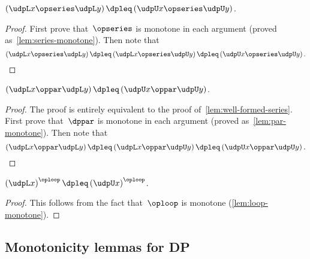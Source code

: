 \begin{lemma}
    \label{lem:well-formed-series}$\left(\udpL x\opseries\udpL y\right)\dpleq\left(\udpU x\opseries\udpU y\right)$.
\end{lemma}
\begin{proof}
    First prove that~$\opseries$ is monotone in each argument (proved
    as~\cref{lem:series-monotone}).
    Then note that
    \[
        \left(\udpL x\opseries\udpL y\right)\dpleq\left(\udpL x\opseries\udpU y\right)\dpleq\left(\udpU x\opseries\udpU y\right).
    \]
\end{proof}
\begin{lemma}
    \label{lem:well-formed-par}$\left(\udpL x\oppar\udpL y\right)\dpleq\left(\udpU x\oppar\udpU y\right)$.
\end{lemma}
\begin{proof}
    The proof is entirely equivalent to the proof of~\cref{lem:well-formed-series}.
    First prove that~$\dppar$ is monotone in each argument (proved as~\cref{lem:par-monotone}).
    Then note that~
    \[
        \left(\udpL x\oppar\udpL y\right)\dpleq\left(\udpL x\oppar\udpU y\right)\dpleq\left(\udpU x\oppar\udpU y\right).
    \]
\end{proof}

\begin{lemma}
    \label{lem:well-formed-loop}$\left(\udpL x\right)^{\oploop}\dpleq\left(\udpU x\right)^{\oploop}$.
\end{lemma}
\begin{proof}
    This follows from the fact that~$\oploop$ is monotone (\cref{lem:loop-monotone}).
\end{proof}

\subsection{Monotonicity lemmas for DP}

